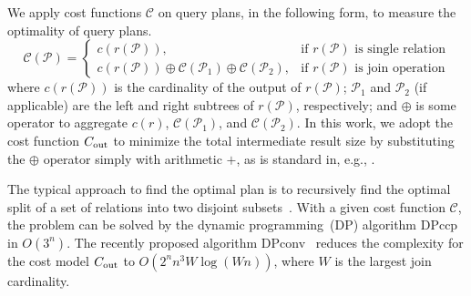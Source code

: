 We apply cost functions $\mathcal{C}$ on query plans, in the following form, to measure the optimality of query plans.
\[
    \mathcal{C}(\mathcal{P})= \left\{ \begin{array}{ll}
        c(r(\mathcal{P})), & \text{if $r(\mathcal{P})$ is single relation} \\
        c(r(\mathcal{P}))\oplus \mathcal{C}(\mathcal{P}_1) \oplus \mathcal{C}(\mathcal{P}_2), & \text{if $r(\mathcal{P})$ is join operation}
    \end{array} 
    \right.
\]
where $c(r(\mathcal{P}))$ is the cardinality of the output of $r(\mathcal{P})$; $\mathcal{P}_1$ and $\mathcal{P}_2$ (if applicable) are the left and right subtrees of $r(\mathcal{P})$, respectively; and $\oplus$ is some operator to aggregate $c(r)$, $\mathcal{C}(\mathcal{P}_1)$, and $\mathcal{C}(\mathcal{P}_2)$.  In this work, we adopt the cost function $C_{\rm out}$ to minimize the total intermediate result size by substituting the $\oplus$ operator simply with arithmetic $+$, as is standard in, e.g., \cite{stoian_dpconv_2024,fegaras_new_1998,neumann_adaptive_2018,cluet_complexity_1995}.  

The typical approach to find the optimal plan is to recursively find the optimal split of a set of relations into two disjoint subsets~\cite{selinger_access_1979,vance_rapid_1996,vance_join-order_1998,moerkotte_dynamic_2008,stoian_dpconv_2024}.   With a given cost function $\mathcal{C}$, the problem can be solved by the dynamic programming~(DP) algorithm DPccp~\cite{moerkotte_dynamic_2008} in $O(3^n)$. The recently proposed algorithm DPconv~\cite{stoian_dpconv_2024} reduces the complexity for the cost model $C_{\rm out}$ to $O(2^n n^3 W \log (Wn))$, where $W$ is the largest join cardinality.

